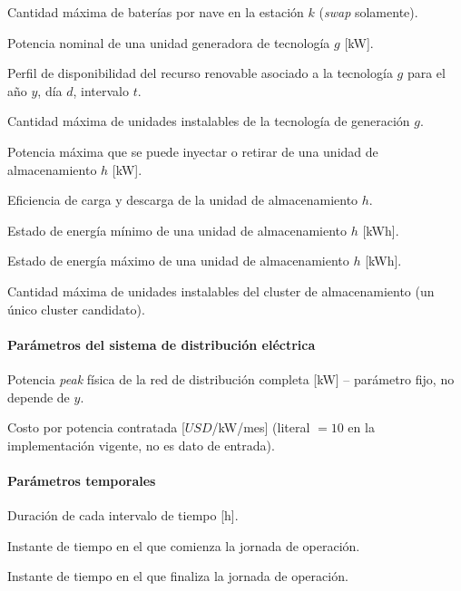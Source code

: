 \begin{description}[leftmargin=3cm, style=nextline]
    \item[$n_k^{bat/bay}$] Cantidad máxima de baterías por nave en la estación $k$ (\textit{swap} solamente).
    \item [$p_g^{max}$] Potencia nominal de una unidad generadora de tecnología $g$ [kW].
    \item [$\alpha_{g,y,d,t}$] Perfil de disponibilidad del recurso renovable asociado a la tecnología $g$ para el año $y$, día $d$, intervalo $t$.
    \item [$g^{max}_g$] Cantidad máxima de unidades instalables de la tecnología de generación $g$.
    \item [$p^{max}_h$] Potencia máxima que se puede inyectar o retirar de una unidad de almacenamiento $h$ [kW].
    \item [$\eta_{h}$] Eficiencia de carga y descarga de la unidad de almacenamiento $h$.
    \item [$a_h^{min}$] Estado de energía mínimo de una unidad de almacenamiento $h$ [kWh].
    \item [$a_h^{max}$] Estado de energía máximo de una unidad de almacenamiento $h$ [kWh].
    \item [$h^{max}$] Cantidad máxima de unidades instalables del cluster de almacenamiento (un único cluster candidato).
\end{description}

\paragraph{Parámetros del sistema de distribución eléctrica}
\begin{description}[leftmargin=3cm, style=nextline]
    \item[$p^{peak}$] Potencia \textit{peak} física de la red de distribución completa [kW] -- parámetro fijo, no depende de $y$.
    \item[$c^{P_{elec}}$] Costo por potencia contratada [$USD$/kW/mes] (literal $=10$ en la implementación vigente, no es dato de entrada).
\end{description}

\paragraph{Parámetros temporales}
\begin{description}[leftmargin=3cm, style=nextline]
    \item[$\Delta t$] Duración de cada intervalo de tiempo [h].
    \item[$t_{ini}$] Instante de tiempo en el que comienza la jornada de operación.
    \item[$t_{fin}$] Instante de tiempo en el que finaliza la jornada de operación.
\end{description}

